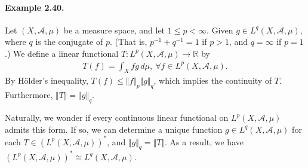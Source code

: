 \documentclass{article}
\begin{document}
\paragraph{Example 2.40.\label{example:2.40}} Let $(X,\mathscr{A},\mu)$ be a measure space, and let $1\leq p < \infty$. Given $g\in L^q(X,\mathscr{A},\mu)$, where $q$ is the conjugate of $p$. (That is, $p^{-1}+q^{-1}=1$ if $p>1$, and $q=\infty$ if $p=1$.) We define a linear functional $T:L^p(X,\mathscr{A},\mu)\to\mathbb{R}$ by
\begin{align*}
	T(f) = \int_X fg\, d\mu,\ \forall f\in L^p(X,\mathscr{A},\mu).
\end{align*} 
By Hölder's inequality, $T(f)\leq\Vert f\Vert_p\Vert g\Vert_q$, which implies the continuity of $T$. Furthermore, $\Vert T\Vert=\Vert g\Vert_q$.
\vspace{0.1cm}

Naturally, we wonder if every continuous linear functional on $L^p(X,\mathscr{A},\mu)$ admits this form. If so, we can determine a unique function $g\in L^q(X,\mathscr{A},\mu)$ for each $T\in (L^p(X,\mathscr{A},\mu))^*$, and $\Vert g\Vert_q=\Vert T\Vert$. As a result, we have $(L^p(X,\mathscr{A},\mu))^*\cong L^q(X,\mathscr{A},\mu)$.
\end{document}
